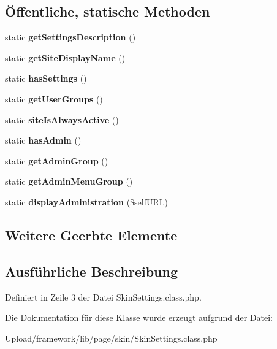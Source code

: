\subsection*{Öffentliche, statische Methoden}
\begin{DoxyCompactItemize}
\item 
\mbox{\label{class_skin_settings_ad2f577da604fc337833552805b8ea8ec}} 
static {\bfseries get\+Settings\+Description} ()
\item 
\mbox{\label{class_skin_settings_ac58ef0f819a73a32d7911ffc3cac9c1f}} 
static {\bfseries get\+Site\+Display\+Name} ()
\item 
\mbox{\label{class_skin_settings_a0c1a8818ba34c6f99310e53c993ce311}} 
static {\bfseries has\+Settings} ()
\item 
\mbox{\label{class_skin_settings_a21a3a39c1c8528ca7d5f1b29bb17e787}} 
static {\bfseries get\+User\+Groups} ()
\item 
\mbox{\label{class_skin_settings_a4193f0672827d58ebc6e613227d46646}} 
static {\bfseries site\+Is\+Always\+Active} ()
\item 
\mbox{\label{class_skin_settings_ae809fb005d25739204184bfa0d8d2daf}} 
static {\bfseries has\+Admin} ()
\item 
\mbox{\label{class_skin_settings_abeda3d5101478ae6dd85758f83b494bf}} 
static {\bfseries get\+Admin\+Group} ()
\item 
\mbox{\label{class_skin_settings_a9824071ce4c7a25a5fae4cb30d10d1f7}} 
static {\bfseries get\+Admin\+Menu\+Group} ()
\item 
\mbox{\label{class_skin_settings_a153e40dbcb2781ea82f268a6b6a5ead1}} 
static {\bfseries display\+Administration} (\$self\+U\+RL)
\end{DoxyCompactItemize}
\subsection*{Weitere Geerbte Elemente}


\subsection{Ausführliche Beschreibung}


Definiert in Zeile 3 der Datei Skin\+Settings.\+class.\+php.



Die Dokumentation für diese Klasse wurde erzeugt aufgrund der Datei\+:\begin{DoxyCompactItemize}
\item 
Upload/framework/lib/page/skin/Skin\+Settings.\+class.\+php\end{DoxyCompactItemize}
